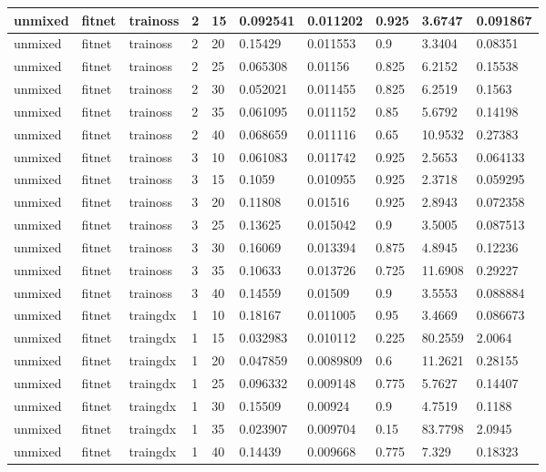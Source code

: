 \begin{longtable}{lllllllll}
unmixed & fitnet & trainoss & 2 & 15 & 0.092541 & 0.011202 & 0.925 & 3.6747 & 0.091867 \\ \hline 
unmixed & fitnet & trainoss & 2 & 20 & 0.15429 & 0.011553 & 0.9 & 3.3404 & 0.08351 \\ \hline 
unmixed & fitnet & trainoss & 2 & 25 & 0.065308 & 0.01156 & 0.825 & 6.2152 & 0.15538 \\ \hline 
unmixed & fitnet & trainoss & 2 & 30 & 0.052021 & 0.011455 & 0.825 & 6.2519 & 0.1563 \\ \hline 
unmixed & fitnet & trainoss & 2 & 35 & 0.061095 & 0.011152 & 0.85 & 5.6792 & 0.14198 \\ \hline 
unmixed & fitnet & trainoss & 2 & 40 & 0.068659 & 0.011116 & 0.65 & 10.9532 & 0.27383 \\ \hline 
unmixed & fitnet & trainoss & 3 & 10 & 0.061083 & 0.011742 & 0.925 & 2.5653 & 0.064133 \\ \hline 
unmixed & fitnet & trainoss & 3 & 15 & 0.1059 & 0.010955 & 0.925 & 2.3718 & 0.059295 \\ \hline 
unmixed & fitnet & trainoss & 3 & 20 & 0.11808 & 0.01516 & 0.925 & 2.8943 & 0.072358 \\ \hline 
unmixed & fitnet & trainoss & 3 & 25 & 0.13625 & 0.015042 & 0.9 & 3.5005 & 0.087513 \\ \hline 
unmixed & fitnet & trainoss & 3 & 30 & 0.16069 & 0.013394 & 0.875 & 4.8945 & 0.12236 \\ \hline 
unmixed & fitnet & trainoss & 3 & 35 & 0.10633 & 0.013726 & 0.725 & 11.6908 & 0.29227 \\ \hline 
unmixed & fitnet & trainoss & 3 & 40 & 0.14559 & 0.01509 & 0.9 & 3.5553 & 0.088884 \\ \hline 
unmixed & fitnet & traingdx & 1 & 10 & 0.18167 & 0.011005 & 0.95 & 3.4669 & 0.086673 \\ \hline 
unmixed & fitnet & traingdx & 1 & 15 & 0.032983 & 0.010112 & 0.225 & 80.2559 & 2.0064 \\ \hline 
unmixed & fitnet & traingdx & 1 & 20 & 0.047859 & 0.0089809 & 0.6 & 11.2621 & 0.28155 \\ \hline 
unmixed & fitnet & traingdx & 1 & 25 & 0.096332 & 0.009148 & 0.775 & 5.7627 & 0.14407 \\ \hline 
unmixed & fitnet & traingdx & 1 & 30 & 0.15509 & 0.00924 & 0.9 & 4.7519 & 0.1188 \\ \hline 
unmixed & fitnet & traingdx & 1 & 35 & 0.023907 & 0.009704 & 0.15 & 83.7798 & 2.0945 \\ \hline 
unmixed & fitnet & traingdx & 1 & 40 & 0.14439 & 0.009668 & 0.775 & 7.329 & 0.18323 \\ \hline 

\end{longtable}

